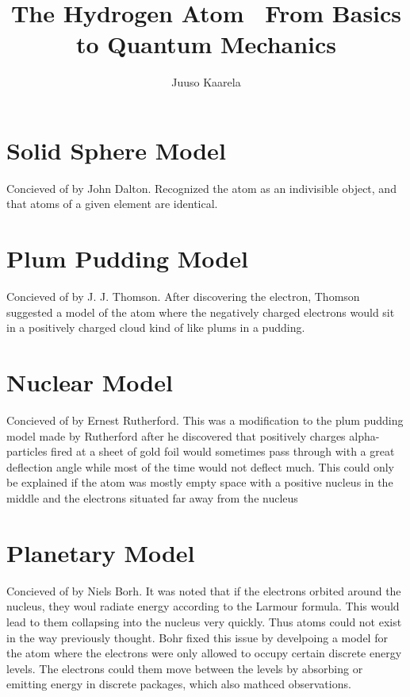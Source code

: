 \documentclass{article}
\title{\textbf{The Hydrogen Atom \textemdash \ From Basics to Quantum Mechanics}}
\author{Juuso Kaarela}
\begin{document}
    \normalsize
    \maketitle

    \section{Solid Sphere Model}

    Concieved of by John Dalton. Recognized the atom as an indivisible object, and that atoms of a given element are identical. 

    \section{Plum Pudding Model}

    Concieved of by J. J. Thomson. After discovering the electron, Thomson suggested a model of the atom where the negatively charged
    electrons would sit in a positively charged cloud kind of like plums in a pudding.

    \section{Nuclear Model}

    Concieved of by Ernest Rutherford. This was a modification to the plum pudding model made by Rutherford after he discovered
    that positively charges alpha-particles fired at a sheet of gold foil would sometimes pass through with a great deflection angle
    while most of the time would not deflect much. This could only be explained if the atom was mostly empty space with a positive
    nucleus in the middle and the electrons situated far away from the nucleus

    \section{Planetary Model}

    Concieved of by Niels Borh. It was noted that if the electrons orbited around the nucleus, they woul radiate energy according to
    the Larmour formula. This would lead to them collapsing into the nucleus very quickly. Thus atoms could not exist in the way previously
    thought. Bohr fixed this issue by develpoing a model for the atom where the electrons were only allowed to occupy certain discrete
    energy levels. The electrons could them move between the levels by absorbing or emitting energy in discrete packages, which also mathced
    observations. 
\end{document}
